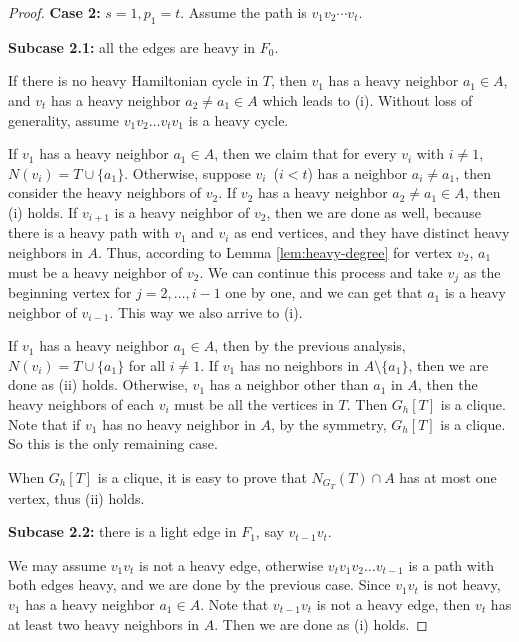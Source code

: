 \documentclass[12pt]{article}
\begin{document}
\begin{proof}
     \noindent
    \textbf{Case 2:} $s=1, p_1 = t$.
    Assume the path is $v_1v_2\cdots v_t$.
    
    \textbf{Subcase 2.1:} all the edges are heavy in $F_0$. %
    
    If there is no heavy Hamiltonian cycle in $T$, then $v_1$ has a heavy neighbor $a_1 \in A$, and $v_t$ has a heavy neighbor $a_2 \neq a_1 \in A$ which leads to (i).
    Without loss of generality, assume $v_1v_2\ldots v_tv_1$ is a heavy cycle.
    
    If $v_1$ has a heavy neighbor $a_1 \in A$, 
    then we claim that for every $v_i$ with $i\neq 1$, $N(v_i)=T\cup \{a_1\}$.
    Otherwise, suppose $v_i$~($i < t$) has a neighbor $a_i \neq a_1$, then consider the heavy neighbors of $v_2$.
    If $v_2$ has a heavy neighbor $a_2 \neq a_1 \in A$, then (i) holds.
    If $v_{i+1}$ is a heavy neighbor of $v_2$, then we are done as well, because there is a heavy path with $v_1$ and $v_i$ as end vertices, and they have distinct heavy neighbors in $A$.
    Thus, according to 
    Lemma \ref{lem:heavy-degree} for vertex $v_2$, $a_1$ must be a heavy neighbor of $v_2$.
    We can continue this process and take $v_j$ as the beginning vertex for $j=2,\dots,i-1$ one by one, and we can get that $a_1$ is a heavy neighbor of $v_{i-1}$. This way we also arrive to (i).

    If $v_1$ has a heavy neighbor $a_1 \in A$, then by the previous analysis, $N(v_i) = T \cup \{a_1\}$ for all $i \neq 1$.
    If $v_1$ has no neighbors in $A\setminus \{a_1\}$, then we are done as (ii) holds.
    Otherwise, $v_1$ has a neighbor other than $a_1$ in $A$, then the heavy neighbors of each $v_i$ must be all the vertices in $T$.
    Then $G_h[T]$ is a clique.
    Note that if $v_1$ has no heavy neighbor in $A$, by the symmetry, $G_h[T]$ is a clique.
    So this is the only remaining case.

    When $G_h[T]$ is a clique, it is easy to prove that $N_{G_T}(T) \cap A$ has at most one vertex, thus (ii) holds.

    \textbf{Subcase 2.2:} there is a light edge in $F_1$, say $v_{t-1}v_{t}$. 

    We may assume $v_1v_t$ is not a heavy edge, otherwise $v_tv_1v_2\dots v_{t-1}$ is a path with both edges heavy, and we are done by the previous case.
    Since $v_1v_t$ is not heavy, $v_1$ has a heavy neighbor $a_1 \in A$.
    Note that $v_{t-1}v_{t}$ is not a heavy edge, then $v_{t}$ has at least two heavy neighbors in $A$.
    Then we are done as (i) holds.


\end{proof}
\end{document}
